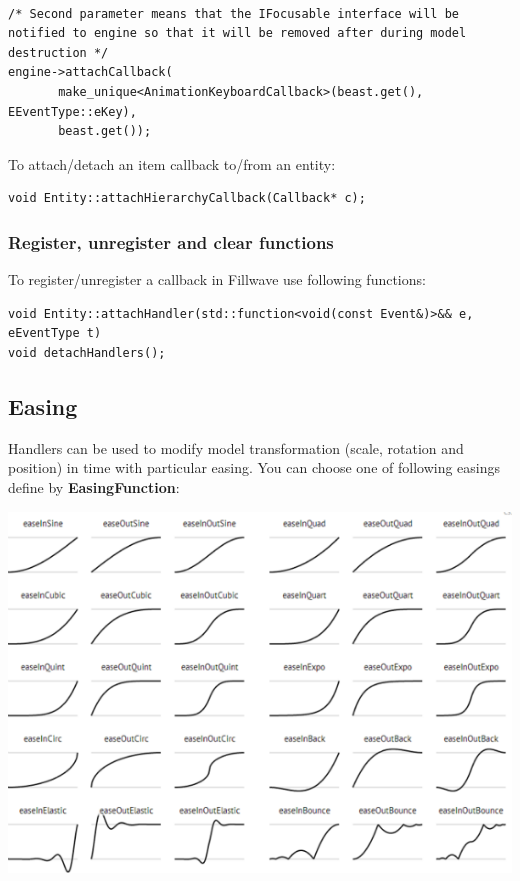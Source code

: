 \documentclass{article}
\begin{document}
\begin{lstlisting}

/* Second parameter means that the IFocusable interface will be notified to engine so that it will be removed after during model destruction */
engine->attachCallback(
	   make_unique<AnimationKeyboardCallback>(beast.get(), EEventType::eKey),
	   beast.get());

\end{lstlisting}
   
\indent \indent To attach/detach an item callback to/from an entity:

\begin{lstlisting}
void Entity::attachHierarchyCallback(Callback* c);
\end{lstlisting}

\subsubsection{Register, unregister and clear functions}\label{sec:register functions}
\indent \indent To register/unregister a callback in Fillwave use following functions:

\begin{lstlisting}
void Entity::attachHandler(std::function<void(const Event&)>&& e, eEventType t)
void detachHandlers();
\end{lstlisting}

\newpage

\subsection{Easing}\label{sec:Easing}

\indent \indent Handlers can be used to modify model transformation (scale, rotation and position) in time with particular easing. You can choose one of following easings define by \textbf{EasingFunction}:

\begin{center}

\includegraphics[scale=0.6]{easing.png}

\end{center}
\end{document}
